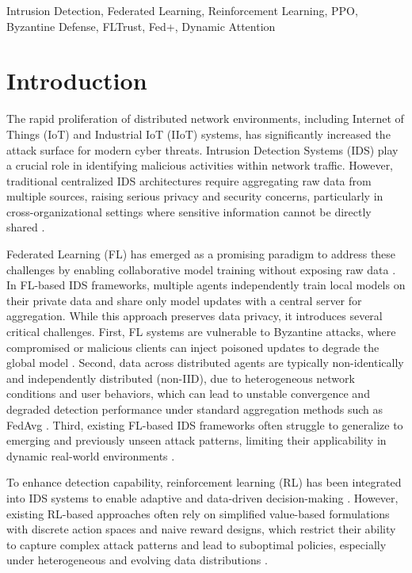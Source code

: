 \documentclass[conference]{IEEEtran}
\begin{document}
\begin{IEEEkeywords}
Intrusion Detection, Federated Learning, Reinforcement Learning, PPO, Byzantine Defense, FLTrust, Fed+, Dynamic Attention
\end{IEEEkeywords}

\section{Introduction}

The rapid proliferation of distributed network environments, including Internet of Things (IoT) and Industrial IoT (IIoT) systems, has significantly increased the attack surface for modern cyber threats. Intrusion Detection Systems (IDS) play a crucial role in identifying malicious activities within network traffic. However, traditional centralized IDS architectures require aggregating raw data from multiple sources, raising serious privacy and security concerns, particularly in cross-organizational settings where sensitive information cannot be directly shared \cite{nslkdd}.

Federated Learning (FL) has emerged as a promising paradigm to address these challenges by enabling collaborative model training without exposing raw data \cite{federated_avg}. In FL-based IDS frameworks, multiple agents independently train local models on their private data and share only model updates with a central server for aggregation. While this approach preserves data privacy, it introduces several critical challenges. First, FL systems are vulnerable to Byzantine attacks, where compromised or malicious clients can inject poisoned updates to degrade the global model \cite{fltrust}. Second, data across distributed agents are typically non-identically and independently distributed (non-IID), due to heterogeneous network conditions and user behaviors, which can lead to unstable convergence and degraded detection performance under standard aggregation methods such as FedAvg \cite{federated_avg, fedprox}. Third, existing FL-based IDS frameworks often struggle to generalize to emerging and previously unseen attack patterns, limiting their applicability in dynamic real-world environments \cite{sommer}.

To enhance detection capability, reinforcement learning (RL) has been integrated into IDS systems to enable adaptive and data-driven decision-making \cite{rl_book}. However, existing RL-based approaches often rely on simplified value-based formulations with discrete action spaces and naive reward designs, which restrict their ability to capture complex attack patterns and lead to suboptimal policies, especially under heterogeneous and evolving data distributions \cite{dqn, aima}.
\end{document}
